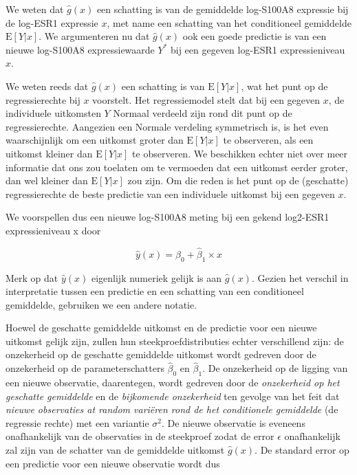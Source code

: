 \documentclass[
  12pt,dutch,coursenotes]{book}
\begin{document}
We weten dat \(\hat{g}(x)\) een schatting is van de gemiddelde log-S100A8 expressie bij de log-ESR1 expressie \(x\), met name een schatting van het conditioneel gemiddelde \(\text{E}[Y\vert x]\). We argumenteren nu dat \(\hat{g}(x)\) ook een goede predictie is van een nieuwe log-S100A8 expressiewaarde \(Y^*\) bij een gegeven log-ESR1 expressieniveau \(x\).

We weten reeds dat \(\hat{g}(x)\) een schatting is van \(\text{E}[Y\vert x]\), wat het punt op de regressierechte bij \(x\) voorstelt. Het regressiemodel stelt dat bij een gegeven \(x\), de individuele uitkomsten \(Y\) Normaal verdeeld zijn rond dit punt op de regressierechte. Aangezien een Normale verdeling symmetrisch is, is het even waarschijnlijk om een uitkomst groter dan \(\text{E}[Y\vert x]\) te observeren, als een uitkomst kleiner dan \(\text{E}[Y\vert x]\) te observeren. We beschikken echter niet over meer informatie dat ons zou toelaten om te vermoeden dat een uitkomst eerder groter, dan wel kleiner dan \(\text{E}[Y\vert x]\) zou zijn. Om die reden is het punt op de (geschatte) regressierechte de beste predictie van een individuele uitkomst bij een gegeven \(x\).

We voorspellen dus een nieuwe log-S100A8 meting bij een gekend log2-ESR1 expressieniveau x door

\[
  \hat{y}(x)=\hat{\beta}_0+\hat{\beta}_1 \times x
\]

Merk op dat \(\hat{y}(x)\) eigenlijk numeriek gelijk is aan \(\hat{g}(x)\). Gezien het verschil in interpretatie tussen een predictie en een schatting van een conditioneel gemiddelde, gebruiken we een andere notatie.

Hoewel de geschatte gemiddelde uitkomst en de predictie voor een nieuwe uitkomst gelijk zijn, zullen hun steekproefdistributies echter verschillend zijn:
de onzekerheid op de geschatte gemiddelde uitkomst wordt gedreven door de onzekerheid op de parameterschatters \(\hat\beta_0\) en \(\hat\beta_1\). De onzekerheid op de ligging van een nieuwe observatie, daarentegen, wordt gedreven door de \emph{onzekerheid op het geschatte gemiddelde} en de \emph{bijkomende onzekerheid} ten gevolge van het feit dat \emph{nieuwe observaties at random variëren rond de het conditionele gemiddelde} (de regressie rechte) met een variantie \(\sigma^2\). De nieuwe observatie is eveneens onafhankelijk van de observaties in de steekproef zodat de error \(\epsilon\) onafhankelijk zal zijn van de schatter van de gemiddelde uitkomst \(\hat{g}(x)\). De standard error op een predictie voor een nieuwe observatie wordt dus
\end{document}
